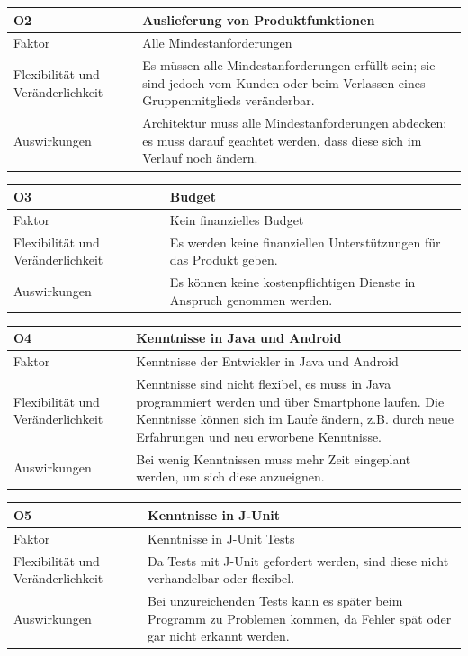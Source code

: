 \documentclass[fontsize=12pt,paper=a4,twoside]{scrartcl}
\begin{document}
\begin{table}[H]
\begin{tabular}{|p{3cm}|p{12cm}|}\hline
\textbf{O2} & \textbf{Auslieferung von Produktfunktionen}\\ \hline \hline
Faktor & Alle Mindestanforderungen\\ \hline
Flexibilität und Veränderlichkeit & Es müssen alle Mindestanforderungen erfüllt sein; sie sind jedoch vom Kunden oder beim Verlassen eines Gruppenmitglieds veränderbar.\\ \hline
Auswirkungen & Architektur muss alle Mindestanforderungen abdecken; es muss darauf geachtet werden, dass diese sich im Verlauf noch ändern.\\ \hline
\end{tabular}
\end{table}

\begin{table}[H]
\begin{tabular}{|p{3cm}|p{12cm}|}\hline
\textbf{O3} & \textbf{Budget} \\ \hline \hline
Faktor & Kein finanzielles Budget\\ \hline
Flexibilität und Veränderlichkeit & Es werden keine finanziellen Unterstützungen für das Produkt geben. \\ \hline
Auswirkungen & Es können keine kostenpflichtigen Dienste in Anspruch genommen werden.\\ \hline
\end{tabular}
\end{table}

\begin{table}[H]
\begin{tabular}{|p{3cm}|p{12cm}|}\hline
\textbf{O4} & \textbf{Kenntnisse in Java und Android} \\ \hline \hline
Faktor & Kenntnisse der Entwickler in Java und Android\\ \hline
Flexibilität und Veränderlichkeit & Kenntnisse sind nicht flexibel, es muss in Java programmiert werden und über Smartphone laufen. Die Kenntnisse können sich im Laufe ändern, z.B. durch neue Erfahrungen und neu erworbene Kenntnisse.\\ \hline
Auswirkungen & Bei wenig Kenntnissen muss mehr Zeit eingeplant werden, um sich diese anzueignen.\\ \hline
\end{tabular}
\end{table}

\begin{table}[H]
\begin{tabular}{|p{3cm}|p{12cm}|}\hline
\textbf{O5} & \textbf{Kenntnisse in J-Unit} \\ \hline \hline
Faktor & Kenntnisse in J-Unit Tests\\ \hline
Flexibilität und Veränderlichkeit & Da Tests mit J-Unit gefordert werden, sind diese nicht verhandelbar oder flexibel.\\ \hline
Auswirkungen & Bei unzureichenden Tests kann es später beim Programm zu Problemen kommen, da Fehler spät oder gar nicht erkannt werden.\\ \hline
\end{tabular}
\end{table}
\end{document}
